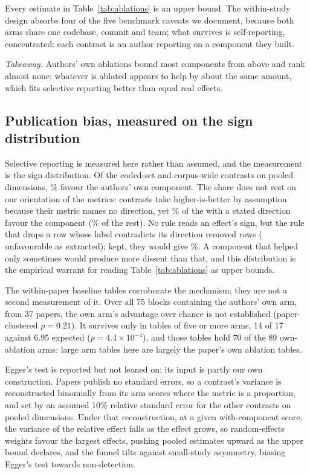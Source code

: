 Every estimate in Table~\ref{tab:ablations} is an upper bound. The within-study design absorbs four of
the five benchmark caveats we document, because both arms share one codebase, commit and team; what
survives is self-reporting, concentrated: each contrast is an author reporting on a component they
built.

\emph{Takeaway.} Authors' own ablations bound most components from above and rank almost none:
whatever is ablated appears to help by about the same amount, which fits selective reporting better
than equal real effects.

\subsection{Publication bias, measured on the sign distribution}\label{subsec:bias}

Selective reporting is measured here rather than assumed, and the measurement is the sign distribution.
Of the \rqSignDenom{} coded-set and corpus-wide contrasts on pooled dimensions, \rqSignSharePct\% favour
the authors' own component. The share does not rest on
our orientation of the metrics: \rqPolarityAssumedN{} contrasts take higher-is-better by assumption
because their metric names no direction, yet \rqPolarityStatedFavourPct\% of the
\rqPolarityStatedN{} with a stated direction favour the component (\rqPolarityAssumedFavourPct\% of the
rest). No rule reads an effect's sign, but the rule that drops a row whose label contradicts
its direction removed \rqDCLDropped{} rows (\rqDCLAgainst{} unfavourable as extracted); kept, they
would give \rqSignShareWithDCLPct\%. A component that helped only sometimes would produce more
dissent than that, and this distribution is the empirical warrant for reading
Table~\ref{tab:ablations} as upper bounds.

The within-paper baseline tables corroborate the mechanism; they are not a second measurement of it.
Over all 75 blocks containing the authors' own arm, from 37 papers, the own arm's advantage over chance
is not established (paper-clustered $p=0.21$). It survives only in tables of five or more arms, 14 of
17 against 6.95 expected ($p=4.4\times10^{-4}$), and those tables hold 70 of the 89 own-ablation arms:
large arm tables here are largely the paper's own ablation tables.

Egger's test \citep{egger1997bias} is reported but not leaned on: its input is partly our own
construction. Papers publish no standard errors, so a contrast's variance is reconstructed binomially
from its arm scores where the metric is a proportion, and set by an assumed 10\% relative standard
error for the other \rqVarAssumedN{} contrasts on pooled dimensions. Under that reconstruction,
at a given with-component score, the variance of the relative effect falls as the effect grows, so
random-effects weights \citep{dersimonian1986meta} favour the largest effects, pushing pooled estimates
upward as the upper bound declares, and the funnel tilts against small-study asymmetry, biasing
Egger's test towards non-detection.

